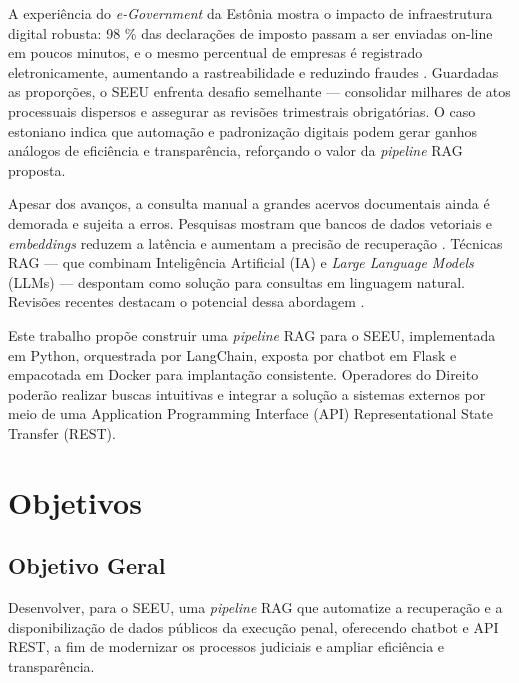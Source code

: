 A experiência do \emph{e-Government} da Estônia mostra o impacto de
infraestrutura digital robusta: 98 \% das declarações de imposto passam a ser
enviadas on-line em poucos minutos, e o mesmo percentual de empresas é
registrado eletronicamente, aumentando a rastreabilidade e reduzindo fraudes
\cite{divald2021eformalization}. Guardadas as proporções, o SEEU enfrenta
desafio semelhante — consolidar milhares de atos processuais dispersos e
assegurar as revisões trimestrais obrigatórias. O caso estoniano indica que
automação e padronização digitais podem gerar ganhos análogos de eficiência e
transparência, reforçando o valor da \emph{pipeline} RAG proposta.

Apesar dos avanços, a consulta manual a grandes acervos documentais ainda é
demorada e sujeita a erros. Pesquisas mostram que bancos de dados vetoriais e
\emph{embeddings} reduzem a latência e aumentam a precisão de recuperação
\cite{taipalus2024vector,gao2023survey}. Técnicas RAG — que combinam
Inteligência Artificial (IA) e \emph{Large Language Models} (LLMs) — despontam
como solução para consultas em linguagem natural. Revisões recentes destacam o
potencial dessa abordagem \cite{qwak2024integrating,pujiono2024implementing}.

Este trabalho propõe construir uma \emph{pipeline} RAG para o SEEU,
implementada em Python, orquestrada por LangChain, exposta por chatbot em Flask
e empacotada em Docker para implantação consistente. Operadores do Direito
poderão realizar buscas intuitivas e integrar a solução a sistemas externos por
meio de uma Application Programming Interface (API) Representational State Transfer (REST).





\section{Objetivos}
\label{sec:objetivos}

\subsection{Objetivo Geral}
Desenvolver, para o SEEU, uma \emph{pipeline} RAG que automatize a recuperação
e a disponibilização de dados públicos da execução penal, oferecendo chatbot e
API REST, a fim de modernizar os processos judiciais e ampliar eficiência e
transparência.


